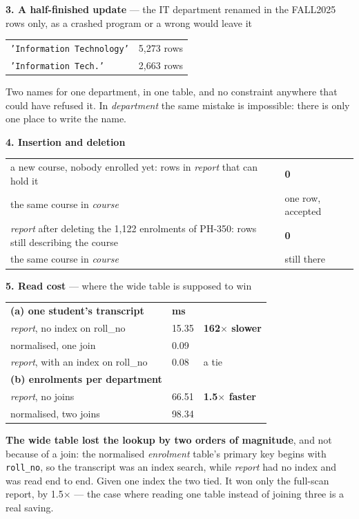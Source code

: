 \begin{measured}
\medskip
\textbf{3. A half-finished update} --- the IT department renamed in the
FALL2025 rows only, as a crashed program or a wrong  would leave
it

\begin{tabular}{@{}L{6.6cm}R{2.6cm}@{}}
\texttt{'Information Technology'} & 5{,}273 rows \\
\texttt{'Information Tech.'} & 2{,}663 rows \\
\end{tabular}

\smallskip
Two names for one department, in one table, and no constraint anywhere that
could have refused it. In \textit{department} the same mistake is impossible:
there is only one place to write the name.

\medskip
\textbf{4. Insertion and deletion}

\begin{tabular}{@{}L{8.0cm}L{6.0cm}@{}}
a new course, nobody enrolled yet: rows in \textit{report} that can hold it &
  \textbf{0} \\
the same course in \textit{course} & one row, accepted \\
\textit{report} after deleting the 1{,}122 enrolments of PH-350: rows still
  describing the course & \textbf{0} \\
the same course in \textit{course} & still there \\
\end{tabular}

\medskip
\textbf{5. Read cost} --- where the wide table is supposed to win

\begin{tabular}{@{}L{8.0cm}R{2.4cm}L{3.6cm}@{}}
\textbf{(a) one student's transcript} & \textbf{ms} & \\
\textit{report}, no index on roll\_no & 15.35 & \textbf{162$\times$ slower} \\
normalised, one join & 0.09 & \\
\textit{report}, with an index on roll\_no & 0.08 & a tie \\
\textbf{(b) enrolments per department} & & \\
\textit{report}, no joins & 66.51 & \textbf{1.5$\times$ faster} \\
normalised, two joins & 98.34 & \\
\end{tabular}

\smallskip
\textbf{The wide table lost the lookup by two orders of magnitude}, and not
because of a join: the normalised \textit{enrolment} table's primary key
begins with \texttt{roll\_no}, so the transcript was an index search, while
\textit{report} had no index and was read end to end. Given one index the two
tied. It won only the full-scan report, by 1.5$\times$ --- the case where
reading one table instead of joining three is a real saving.
\end{measured}

